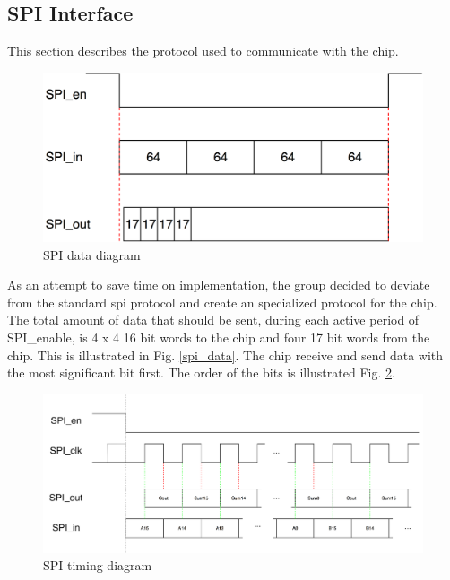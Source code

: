 
 \newpage
\subsection{SPI Interface}
This section describes the protocol used to communicate with the chip.

\begin{figure}[H]
\centering
\captionsetup{justification=centering}
\includegraphics[scale=0.35]{../figures/spi_data.png}
\caption{SPI data diagram}
\label{data}
\end{figure}

As an attempt to save time on implementation, the group decided to deviate from the standard spi protocol and create an specialized protocol for the chip.\\
The total amount of data that should be sent, during each active period of SPI_enable, is 4 x 4 16 bit words to the chip and four 17 bit words from the chip. This is illustrated in Fig. \ref{spi_data}.
The chip receive and send data with the most significant bit first. The order of the bits is illustrated Fig. \ref{spi_int}. \\

\begin{figure}[H]
\centering
\captionsetup{justification=centering}
\includegraphics[scale=0.35]{../figures/spi_interface.png}
\caption{SPI timing diagram}
\label{spi_int}
\end{figure}


